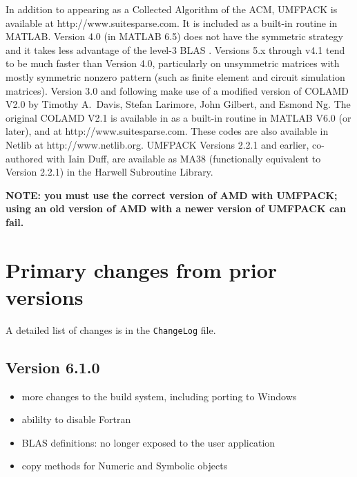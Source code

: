 \documentclass[11pt]{article}
\begin{document}
In addition to appearing as a Collected Algorithm of the ACM,
UMFPACK is available at \newline http://www.suitesparse.com.
It is included as a built-in routine in MATLAB.
Version 4.0 (in MATLAB 6.5)
does not have the symmetric strategy and it takes
less advantage of the level-3
BLAS \cite{DaydeDuff99,ACM679a,ATLAS,GotoVandeGeijn02}.
Versions 5.x through v4.1 tend to be much faster than Version 4.0,
particularly on unsymmetric matrices with mostly symmetric
nonzero pattern (such as finite element and circuit simulation matrices).
Version 3.0 and following make
use of a modified version of COLAMD V2.0 by Timothy A.~Davis, Stefan
Larimore, John Gilbert, and Esmond Ng.  The original COLAMD V2.1 is available in
as a built-in routine in MATLAB V6.0 (or later), and at
http://www.suitesparse.com.
These codes are also available in Netlib \cite{netlib} at
http://www.netlib.org.
UMFPACK Versions 2.2.1 and earlier, co-authored with Iain Duff,
are available as
MA38 (functionally equivalent to Version 2.2.1) in the Harwell
Subroutine Library.

{\bf NOTE: you must use the correct version of AMD with UMFPACK; using
an old version of AMD with a newer version of UMFPACK can fail.}

\section{Primary changes from prior versions}

A detailed list of changes is in the {\tt ChangeLog} file.

\subsection{Version 6.1.0}

\begin{itemize}
    \item more changes to the build system, including porting to Windows
    \item abililty to disable Fortran
    \item BLAS definitions: no longer exposed to the user application
    \item copy methods for Numeric and Symbolic objects
\end{itemize}
\end{document}
